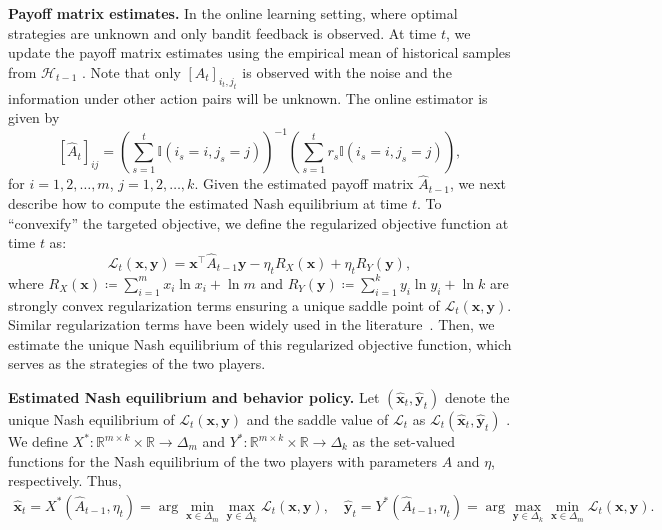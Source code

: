 \documentclass[12pt]{article}
\begin{document}
\textbf{Payoff matrix estimates.} 
In the online learning setting, where optimal strategies are unknown and only bandit feedback is observed. At time $t$, we update the payoff matrix estimates using the empirical mean of historical samples from $\mathcal{H}_{t-1}$ \citep{o2021matrix,wijewardena2025online,maiti2025limitations}. Note that only $[A_t]_{i_t,j_t}$ is observed with the noise and the information under other action pairs will be unknown. The online estimator is given by
\begin{equation}
\label{equ:ahat}
    [\widehat{A}_t]_{i j} = \left(\sum_{s=1}^{t}\mathbb{I}(i_s=i,j_s=j) \right)^{-1} \left( \sum_{s=1}^{t}r_s \mathbb{I}(i_s=i,j_s=j) \right),
\end{equation}
for $i=1,2,\dots,m$, $j=1,2,\dots,k$. Given the estimated payoff matrix $\widehat{A}_{t-1}$, we next describe how to compute the estimated Nash equilibrium at time $t$. To ``convexify'' the targeted objective,
we define the regularized objective function at time $t$ as:
\begin{equation}
    \mathcal{L}_t(\bm{x},\bm{y}) = \bm{x}^\top \widehat{A}_{t-1} \bm{y} - \eta_t R_X(\bm{x})+\eta_t R_Y(\bm{y}),
\end{equation}
where $R_X(\bm{x}) \coloneqq \sum_{i=1}^{m}x_i\ln x_i + \ln{m}$ and $ R_Y(\bm{y}) \coloneqq \sum_{i=1}^{k}y_i\ln y_i + \ln{k}$ are strongly convex regularization terms ensuring a unique saddle point of $\mathcal{L}_t(\bm{x},\bm{y})$. Similar regularization terms have been widely used in the  literature~\citep[see e.g.,][]{grnarova2017online,rivera2025online}. 
Then, we estimate the unique Nash equilibrium of this regularized objective function, which serves as the strategies of the two players.



\noindent\textbf{Estimated Nash equilibrium and behavior policy.}
Let $(\widehat{\bm{x}}_t,\widehat{\bm{y}}_t)$ denote the unique Nash equilibrium of $\mathcal{L}_t(\bm{x},\bm{y})$ and the saddle value of $\mathcal{L}_t$ as $\mathcal{L}_t(\widehat{\bm{x}}_t,\widehat{\bm{y}}_t)$ \citep{milgrom2002envelope}. 
We define $X^\ast:\mathbb{R}^{m \times k} \times \mathbb{R} \rightarrow \Delta_m$ and $Y^\ast:\mathbb{R}^{m \times k} \times \mathbb{R} \rightarrow \Delta_k$ as the set-valued functions for the Nash equilibrium of the two players with parameters $A$ and $\eta$, respectively.
Thus,
\begin{equation}
\label{equ:NE_bandit}
\begin{aligned}
    \widehat{\bm{x}}_t
     =
    X^\ast(\widehat{A}_{t-1},\eta_t)
    =
    \arg\min_{\bm{x} \in \Delta_m}
    \max_{\bm{y} \in \Delta_k}
    \mathcal{L}_t(\bm{x},\bm{y}), \quad
    \widehat{\bm{y}}_t
    =
    Y^\ast(\widehat{A}_{t-1},\eta_t)
    =
    \arg\max_{\bm{y} \in \Delta_k}
    \min_{\bm{x} \in \Delta_m}
    \mathcal{L}_t(\bm{x},\bm{y}).
\end{aligned}
\end{equation}
\end{document}

